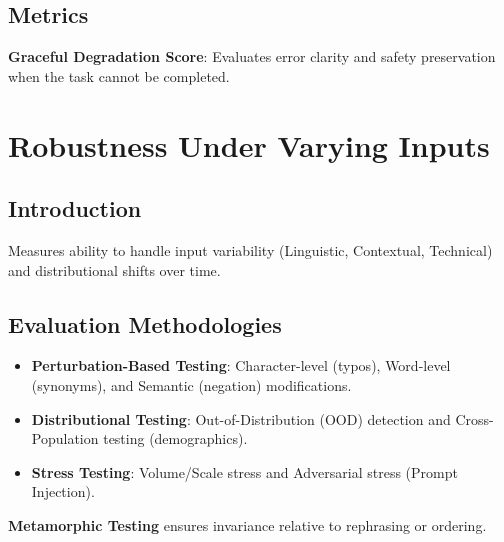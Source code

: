 \begin{TNtwocol}
\subsection{Metrics}
\textbf{Graceful Degradation Score}: Evaluates error clarity and safety preservation when the task cannot be completed.
\section{Robustness Under Varying Inputs }
\subsection{Introduction}
Measures ability to handle input variability (Linguistic, Contextual, Technical) and distributional shifts over time.

\subsection{Evaluation Methodologies}
\begin{itemize}
    \item \textbf{Perturbation-Based Testing}: Character-level (typos), Word-level (synonyms), and Semantic (negation) modifications.
    \item \textbf{Distributional Testing}: Out-of-Distribution (OOD) detection and Cross-Population testing (demographics).
    \item \textbf{Stress Testing}: Volume/Scale stress and Adversarial stress (Prompt Injection).
\end{itemize}
\textbf{Metamorphic Testing} ensures invariance relative to rephrasing or ordering.
\end{TNtwocol}
